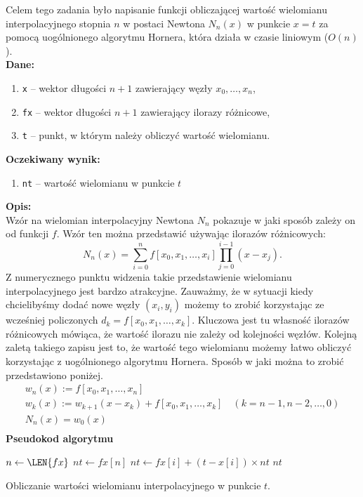 \documentclass[]{article}
\begin{document}
	Celem tego zadania było napisanie funkcji obliczającej wartość wielomianu interpolacyjnego stopnia $n$ w postaci Newtona $N_{n}(x)$ w punkcie $x = t$ za pomocą uogólnionego algorytmu Hornera, która działa w czasie liniowym ($O(n)$). \\
	\textbf{Dane:}
	\begin{enumerate}[]
		\item \texttt{x} -- wektor długości $n+1$ zawierający węzły $x_0, \ldots, x_n$,
		\item \texttt{fx} -- wektor długości $n+1$ zawierający ilorazy różnicowe,
		\item \texttt{t} -- punkt, w którym należy obliczyć wartość wielomianu.
	\end{enumerate}
	\textbf{Oczekiwany wynik:}
	\begin{enumerate}[]
		\item \texttt{nt} -- wartość wielomianu w punkcie $t$
	\end{enumerate}
	\textbf{Opis:}\\
	\noindent Wzór na wielomian interpolacyjny Newtona $N_n$ pokazuje w jaki sposób zależy on od funkcji $f$. Wzór ten można przedstawić używając ilorazów różnicowych:
	$$N_n(x) = \sum_{i=0}^n f[x_0,x_{1}, \ldots, x_{i}] \prod_{j=0}^{i-1}(x-x_j).$$
	Z numerycznego punktu widzenia takie przedstawienie wielomianu interpolacyjnego jest bardzo atrakcyjne. Zauważmy, że w sytuacji kiedy chcielibyśmy dodać nowe węzły $(x_i, y_i)$ możemy to zrobić korzystając ze wcześniej policzonych $d_k = f[x_0,x_1, \ldots, x_k]$. Kluczowa jest tu własność ilorazów różnicowych mówiąca, że wartość ilorazu nie zależy od kolejności węzłów. Kolejną zaletą takiego zapisu jest to, że wartość tego wielomianu możemy łatwo obliczyć korzystając z uogólnionego algorytmu Hornera. Sposób w jaki można to zrobić przedstawiono poniżej.
	\begin{align*}
	&w_n(x) := f[x_0, x_1, \ldots, x_n]& \nonumber \\
	&w_k(x) := w_{k+1}(x-x_k)+ f[x_0, x_1, \ldots, x_k]	\quad(k=n-1, n-2, \ldots, 0)& \nonumber \\
	&N_n(x) = w_0(x) \nonumber \\
	\end{align*}
	\clearpage
	\noindent\textbf{Pseudokod algorytmu}\\
	\begin{algorithm}[h]
		\DontPrintSemicolon
		
		 {
			$n \gets \LEN{fx}$\;
			$nt \gets fx[n]$\;
			 {
				$nt \gets fx[i] + (t - x[i]) \times nt$\; 		
			}
			\KwRet $nt$\;
		}
		\caption{Obliczanie wartości wielomianu interpolacyjnego w punkcie $t$.}
	\end{algorithm}			
	
\end{document}
